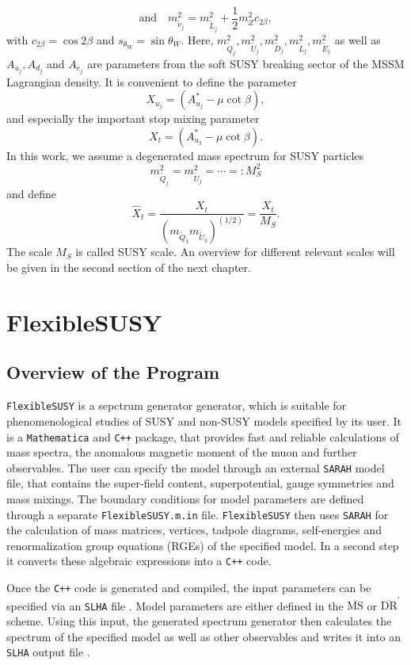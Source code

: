 \documentclass[a4paper,12pt]{book}
\begin{document}
\begin{equation}
\text{and} \quad  m^2_{\tilde{\nu}_j} = m^2_{\tilde{L}_j} + \frac{1}{2} m_Z^2 c_{2\beta},
\end{equation}
with $c_{2\beta} = \cos 2\beta$ and $s_{\theta_W} = \sin\theta_W$. Here, $m^2_{\tilde{Q}_j},  m^2_{\tilde{U}_j}, m^2_{\tilde{D}_j},  m^2_{\tilde{L}_j},  m^2_{\tilde{E}_j}$ as well as $A_{u_j}, A_{d_j}$ and  $A_{e_j}$ are parameters from the soft SUSY breaking sector of the MSSM Lagrangian density. It is convenient to define the parameter
\begin{equation}
X_{u_j} = \left(A_{u_j}^*-\mu \cot \beta\right),
\end{equation}
and especially the important stop mixing parameter 
\begin{equation}
X_t = \left(A_{u_3}^*-\mu \cot \beta\right).
\end{equation}
In this work, we assume a degenerated mass spectrum for SUSY particles 
\begin{equation}
m_{\tilde{Q}_j}^2=m_{\tilde{U}_j}^2=\cdots = \colon M_S^2
\end{equation}
and define
\begin{equation}
\hat{X}_t =\frac{X_t}{(m_{\tilde{Q}_3} m_{\tilde{U}_3})^{(1/2)}}= \frac{X_t}{M_S}.
\end{equation}
The scale $M_S$ is called SUSY scale. An overview for different relevant scales will be given in the second section of the next chapter. 
\chapter{FlexibleSUSY}
\label{chapter::FS}
\section{Overview of the Program}
\texttt{FlexibleSUSY} \cite{FS,FS2} is a sepctrum generator generator, which is suitable for phenomenological studies of SUSY and non-SUSY models specified by its user. It is a \texttt{Mathematica} and \texttt{C++} package, that provides fast and reliable calculations of mass spectra, the anomalous magnetic moment of the muon and further observables. The user can specify the model through an external \texttt{SARAH} \cite{sarah1,sarah2,sarah3,sarah4,sarah5} model file, that contains the super-field content, superpotential, gauge symmetries and mass mixings. The boundary conditions for model parameters are defined through a separate \texttt{FlexibleSUSY.m.in} file. \texttt{FlexibleSUSY} then  uses \texttt{SARAH} for the calculation of mass matrices, vertices, tadpole diagrams, self-energies and renormalization group equations (RGEs) of the specified model. In a second step it converts these algebraic expressions into a \texttt{C++} code.\par
Once the \texttt{C++} code is generated and compiled, the input parameters can be specified via an \texttt{SLHA} file \cite{slha1,slha2}. Model parameters are either defined in the $\overline{\text{MS}}$ or $\overline{\text{DR}}^{\prime}$ scheme. Using this input, the generated spectrum generator then calculates the spectrum of the specified model as well as other observables and writes it into an \texttt{SLHA} output file \cite{FS}. 
\end{document}
